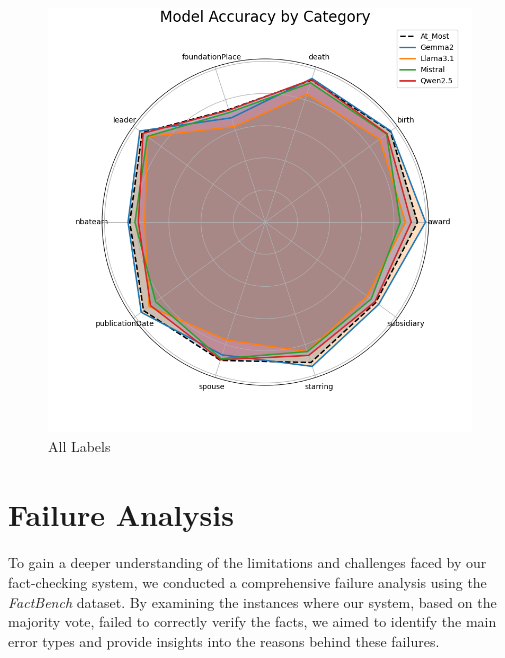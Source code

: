\begin{figure}[ht!]
    \centering
    \begin{minipage}[b]{0.4\textwidth}
        \centering
        \includegraphics[width=\textwidth]{res/combined_radar_chart}
        \caption{All Labels}
        \label{fig:all-radar-chart}
    \end{minipage}
\end{figure}


\section{Failure Analysis}\label{sec:faiure-analysis}
To gain a deeper understanding of the limitations and challenges faced by our fact-checking system, we conducted a comprehensive failure analysis using the \textit{FactBench} dataset.
By examining the instances where our system, based on the majority vote, failed to correctly verify the facts, we aimed to identify the main error types and provide insights into the reasons behind these failures.
